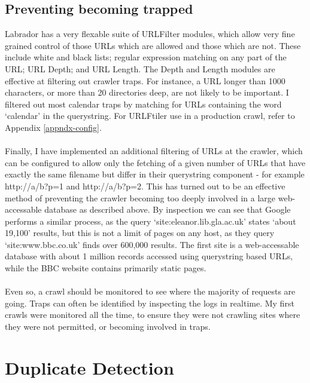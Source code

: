 \subsection{Preventing becoming trapped}\label{sect-preventtrapped}
Labrador has a very flexable suite of URLFilter modules, which allow very fine grained control of those URLs which are allowed and those which are not. These include white and black lists; regular expression matching on any part of the URL; URL Depth; and URL Length. The Depth and Length modules are effective at filtering out crawler traps. For instance, a URL longer than 1000 characters, or more than 20 directories deep, are not likely to be important. I filtered out most calendar traps by matching for URLs containing the word `calendar' in the querystring. For URLFtiler use in a production crawl, refer to Appendix \ref{appndx-config}. \\
\ \\
Finally, I have implemented an additional filtering of URLs at the crawler, which can be configured to allow only the fetching of a given number of URLs that have exactly the same filename but differ in their querystring component - for example http://a/b?p=1 and http://a/b?p=2. This has turned out to be an effective method of preventing the crawler becoming too deeply involved in a large web-accessable database as described above. By inspection we can see that Google performs a similar process, as the query `site:eleanor.lib.gla.ac.uk' states `about 19,100' results, but this is not a limit of pages on any host, as they query `site:www.bbc.co.uk' finds over 600,000 results. The first site is a web-accessable database with about 1 million records accessed using querystring based URLs, while the BBC website contains primarily static pages.\\ \
\\
Even so, a crawl should be monitored to see where the majority of requests are going. Traps can often be identified by inspecting the logs in realtime. My first crawls were monitored all the time, to ensure they were not crawling sites where they were not permitted, or becoming involved in traps.

\section{Duplicate Detection}

